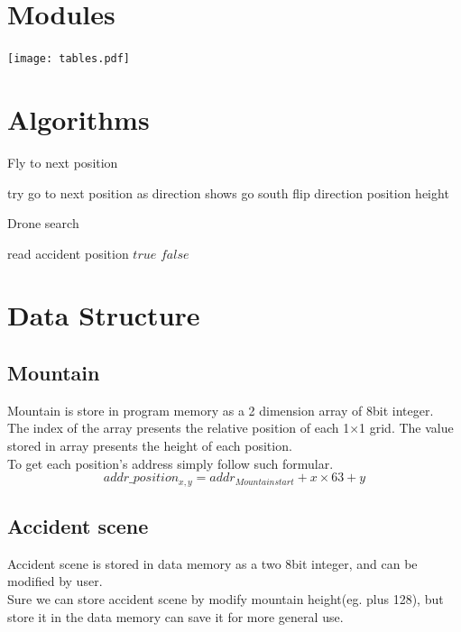 \documentclass[a4paper, 12 pt]{report}
\begin{document}
\section{Modules}
\texttt{[image: tables.pdf]}
\newpage
\section{Algorithms}
\begin{algorithm}
    \caption{Fly to next position}
    \label{alg1}
    \begin{algorithmic}[1]
        \STATE try go to next position as direction shows
            \STATE go south
                \ENDIF
            \STATE flip direction
        \ENDIF
        \RETURN position height
    \end{algorithmic}
\end{algorithm}
\begin{algorithm}
    \caption{Drone search}
    \label{alg2}
    \begin{algorithmic}[1]
        \STATE read accident position
        \RETURN $true$
        \ELSE
        \RETURN $false$
        \ENDIF
    \end{algorithmic}
\end{algorithm}
\newpage
\section{Data Structure}
\subsection{Mountain}
Mountain is store in program memory as a 2 dimension array of 8bit integer.\\
The index of the array presents the relative position of each 1$\times$1 grid.
The value stored in array presents the height of each position.\\
To get each position's address simply follow such formular.
$$ addr\_position_{x,y} = addr_{Mountain start} + x\times 63 + y$$
\subsection{Accident scene}
Accident scene is stored in data memory as a two 8bit integer, and can be modified by user.\\
Sure we can store accident scene by modify mountain height(eg. plus 128), but store it in the data memory can save it for more general use.
\end{document}
